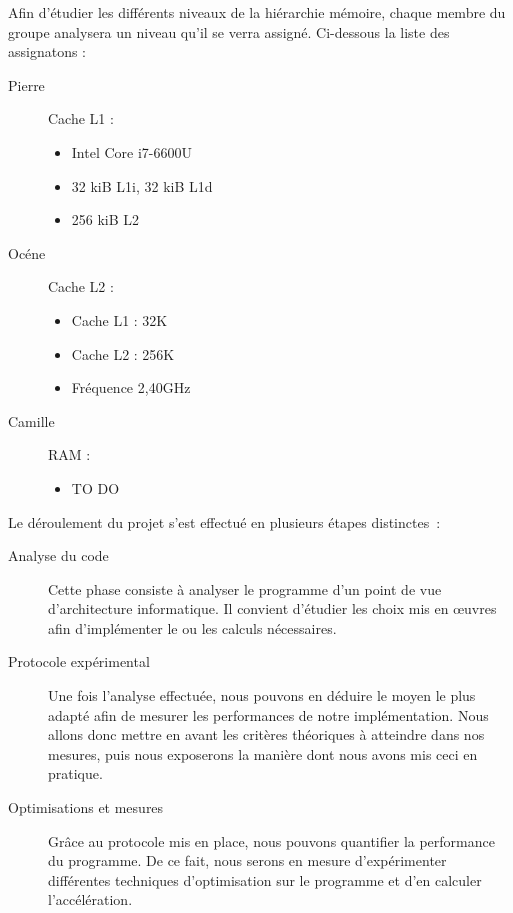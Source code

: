 \documentclass[12pt,a4paper]{article}
\begin{document}
Afin d'étudier les différents niveaux de la hiérarchie mémoire, chaque membre du
groupe analysera un niveau qu'il se verra assigné. Ci-dessous la liste des
assignatons :
\begin{description}

    \item[Pierre] Cache L1 : 
        \begin{itemize}
            \item Intel Core i7-6600U
            \item 32 kiB L1i, 32 kiB L1d
            \item 256 kiB L2
        \end{itemize}
    \item[Océne ] Cache L2 : 
        \begin{itemize}
            \item Cache L1 : 32K
            \item Cache L2 : 256K
            \item Fréquence 2,40GHz
        \end{itemize}
    \item[Camille] RAM : 
        \begin{itemize}
            \item TO DO
        \end{itemize}
\end{description} 

Le déroulement du projet s'est effectué en plusieurs étapes distinctes :
\begin{description}
    \item[Analyse du code] Cette phase consiste à analyser le programme d'un
        point de vue d'architecture informatique. Il convient d'étudier les
        choix mis en œuvres afin d'implémenter le ou les calculs nécessaires.
    \item[Protocole expérimental] Une fois l'analyse effectuée, nous
        pouvons en déduire le moyen le plus adapté afin de mesurer les
        performances de notre implémentation. Nous allons donc mettre en
        avant les critères théoriques à atteindre dans nos mesures, puis
        nous exposerons la manière dont nous avons mis ceci en pratique.
    \item[Optimisations et mesures] Grâce au protocole mis en place, nous
        pouvons quantifier la performance du programme. De ce fait, nous serons
        en mesure d'expérimenter différentes techniques d'optimisation sur le
        programme et d'en calculer l'accélération.
\end{description}
\end{document}
